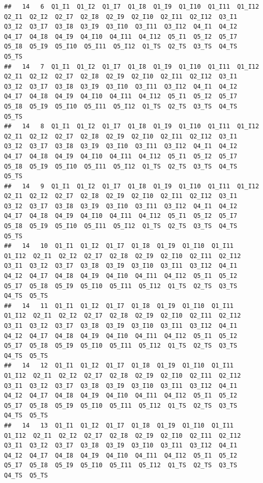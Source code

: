 \documentclass[
]{book}
\begin{document}
\begin{verbatim}
##   14   6  Q1_I1  Q1_I2  Q1_I7  Q1_I8  Q1_I9  Q1_I10  Q1_I11  Q1_I12  Q2_I1  Q2_I2  Q2_I7  Q2_I8  Q2_I9  Q2_I10  Q2_I11  Q2_I12  Q3_I1  Q3_I2  Q3_I7  Q3_I8  Q3_I9  Q3_I10  Q3_I11  Q3_I12  Q4_I1  Q4_I2  Q4_I7  Q4_I8  Q4_I9  Q4_I10  Q4_I11  Q4_I12  Q5_I1  Q5_I2  Q5_I7  Q5_I8  Q5_I9  Q5_I10  Q5_I11  Q5_I12  Q1_TS  Q2_TS  Q3_TS  Q4_TS  Q5_TS
##   14   7  Q1_I1  Q1_I2  Q1_I7  Q1_I8  Q1_I9  Q1_I10  Q1_I11  Q1_I12  Q2_I1  Q2_I2  Q2_I7  Q2_I8  Q2_I9  Q2_I10  Q2_I11  Q2_I12  Q3_I1  Q3_I2  Q3_I7  Q3_I8  Q3_I9  Q3_I10  Q3_I11  Q3_I12  Q4_I1  Q4_I2  Q4_I7  Q4_I8  Q4_I9  Q4_I10  Q4_I11  Q4_I12  Q5_I1  Q5_I2  Q5_I7  Q5_I8  Q5_I9  Q5_I10  Q5_I11  Q5_I12  Q1_TS  Q2_TS  Q3_TS  Q4_TS  Q5_TS
##   14   8  Q1_I1  Q1_I2  Q1_I7  Q1_I8  Q1_I9  Q1_I10  Q1_I11  Q1_I12  Q2_I1  Q2_I2  Q2_I7  Q2_I8  Q2_I9  Q2_I10  Q2_I11  Q2_I12  Q3_I1  Q3_I2  Q3_I7  Q3_I8  Q3_I9  Q3_I10  Q3_I11  Q3_I12  Q4_I1  Q4_I2  Q4_I7  Q4_I8  Q4_I9  Q4_I10  Q4_I11  Q4_I12  Q5_I1  Q5_I2  Q5_I7  Q5_I8  Q5_I9  Q5_I10  Q5_I11  Q5_I12  Q1_TS  Q2_TS  Q3_TS  Q4_TS  Q5_TS
##   14   9  Q1_I1  Q1_I2  Q1_I7  Q1_I8  Q1_I9  Q1_I10  Q1_I11  Q1_I12  Q2_I1  Q2_I2  Q2_I7  Q2_I8  Q2_I9  Q2_I10  Q2_I11  Q2_I12  Q3_I1  Q3_I2  Q3_I7  Q3_I8  Q3_I9  Q3_I10  Q3_I11  Q3_I12  Q4_I1  Q4_I2  Q4_I7  Q4_I8  Q4_I9  Q4_I10  Q4_I11  Q4_I12  Q5_I1  Q5_I2  Q5_I7  Q5_I8  Q5_I9  Q5_I10  Q5_I11  Q5_I12  Q1_TS  Q2_TS  Q3_TS  Q4_TS  Q5_TS
##   14   10  Q1_I1  Q1_I2  Q1_I7  Q1_I8  Q1_I9  Q1_I10  Q1_I11  Q1_I12  Q2_I1  Q2_I2  Q2_I7  Q2_I8  Q2_I9  Q2_I10  Q2_I11  Q2_I12  Q3_I1  Q3_I2  Q3_I7  Q3_I8  Q3_I9  Q3_I10  Q3_I11  Q3_I12  Q4_I1  Q4_I2  Q4_I7  Q4_I8  Q4_I9  Q4_I10  Q4_I11  Q4_I12  Q5_I1  Q5_I2  Q5_I7  Q5_I8  Q5_I9  Q5_I10  Q5_I11  Q5_I12  Q1_TS  Q2_TS  Q3_TS  Q4_TS  Q5_TS
##   14   11  Q1_I1  Q1_I2  Q1_I7  Q1_I8  Q1_I9  Q1_I10  Q1_I11  Q1_I12  Q2_I1  Q2_I2  Q2_I7  Q2_I8  Q2_I9  Q2_I10  Q2_I11  Q2_I12  Q3_I1  Q3_I2  Q3_I7  Q3_I8  Q3_I9  Q3_I10  Q3_I11  Q3_I12  Q4_I1  Q4_I2  Q4_I7  Q4_I8  Q4_I9  Q4_I10  Q4_I11  Q4_I12  Q5_I1  Q5_I2  Q5_I7  Q5_I8  Q5_I9  Q5_I10  Q5_I11  Q5_I12  Q1_TS  Q2_TS  Q3_TS  Q4_TS  Q5_TS
##   14   12  Q1_I1  Q1_I2  Q1_I7  Q1_I8  Q1_I9  Q1_I10  Q1_I11  Q1_I12  Q2_I1  Q2_I2  Q2_I7  Q2_I8  Q2_I9  Q2_I10  Q2_I11  Q2_I12  Q3_I1  Q3_I2  Q3_I7  Q3_I8  Q3_I9  Q3_I10  Q3_I11  Q3_I12  Q4_I1  Q4_I2  Q4_I7  Q4_I8  Q4_I9  Q4_I10  Q4_I11  Q4_I12  Q5_I1  Q5_I2  Q5_I7  Q5_I8  Q5_I9  Q5_I10  Q5_I11  Q5_I12  Q1_TS  Q2_TS  Q3_TS  Q4_TS  Q5_TS
##   14   13  Q1_I1  Q1_I2  Q1_I7  Q1_I8  Q1_I9  Q1_I10  Q1_I11  Q1_I12  Q2_I1  Q2_I2  Q2_I7  Q2_I8  Q2_I9  Q2_I10  Q2_I11  Q2_I12  Q3_I1  Q3_I2  Q3_I7  Q3_I8  Q3_I9  Q3_I10  Q3_I11  Q3_I12  Q4_I1  Q4_I2  Q4_I7  Q4_I8  Q4_I9  Q4_I10  Q4_I11  Q4_I12  Q5_I1  Q5_I2  Q5_I7  Q5_I8  Q5_I9  Q5_I10  Q5_I11  Q5_I12  Q1_TS  Q2_TS  Q3_TS  Q4_TS  Q5_TS

\end{verbatim}
\end{document}
